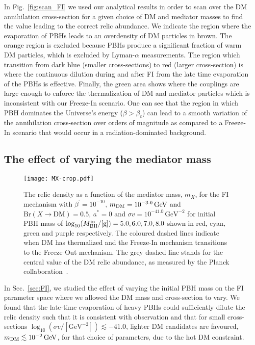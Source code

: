 \documentclass[aps,prd,reprint,twocolumn,preprintnumbers,floatfix,nofootinbib]{revtex4-1}
\newcommand{\mDM}{m_{\rm DM}}
\newcommand{\MBH}{M_{\rm BH}}
\newcommand{\figref}[1]{Fig.~\ref{#1}}
\newcommand{\secref}[1]{Sec.~\ref{#1}}
\begin{document}
In \figref{fig:scan_FI} we used our analytical results in order to scan over the DM annihilation cross-section for a given choice of DM and mediator masses to find the value leading to the correct relic abundance. We indicate the region where the evaporation of PBHs leads to an overdensity of DM particles in brown. The orange region is excluded because PBHs produce a significant fraction of warm DM particles, which is excluded by Lyman-$\alpha$ measurements.
The region which transition from dark blue (smaller cross-sections) to red (larger  cross-section) is where the continuous dilution during and after FI from the late time evaporation of the PBHs is effective. Finally, the green area shows where the couplings are large enough to enforce the thermalization of DM and mediator particles which is inconsistent with our Freeze-In scenario. One can see that the region in which PBH dominates the Universe's energy ($\beta>\beta_c$) can lead to a smooth variation of the annihilation cross-section over orders of magnitude as compared to a Freeze-In scenario that would occur in a radiation-dominated background.

\subsection{The effect of varying the mediator mass}
%
\begin{figure}[t!]
\centering
 \texttt{[image: MX-crop.pdf]}
 \caption{\label{fig:FI_mX}The  relic density as a function of the mediator mass, $m_X$, for the FI mechanism with $\beta^\prime = 10^{-10}$, 
 $\mDM = 10^{-3.0}\, \rm{GeV}$  and $\mathrm{Br}(X\to \mathrm{DM}) = 0.5$, $a^{*}=0$ and $\sigma v = 10^{-41.0}\,\text{GeV}^{-2}$ for
initial PBH mass of  $\log_{10}(\MBH^{\rm in}/[\rm{g}]) = 5.0, 6.0, 7.0, 8.0$ shown in red, cyan, green and purple respectively. The coloured dashed lines indicate when  DM has thermalized and the Freeze-In mechanism transitions to the Freeze-Out mechanism. {The grey dashed line stands for the central value of the DM relic abundance, as measured by the Planck collaboration~\cite{Planck:2018vyg}.}}
 \end{figure}
%
In \secref{sec:FI}, we studied the effect of varying the initial PBH mass on the FI parameter space where we allowed the DM mass and cross-section to vary. We found that the late-time evaporation of heavy PBHs could sufficiently dilute the relic density such that it is consistent with observation and that for small cross-sections $\log_{10}(\sigma v/ [\text{GeV}^{-2}]) \lesssim -41.0$, lighter DM candidates are favoured, $\mDM \lesssim 10^{-2}\,\text{GeV}$, for that choice of parameters, due to the hot DM constraint.
\end{document}
